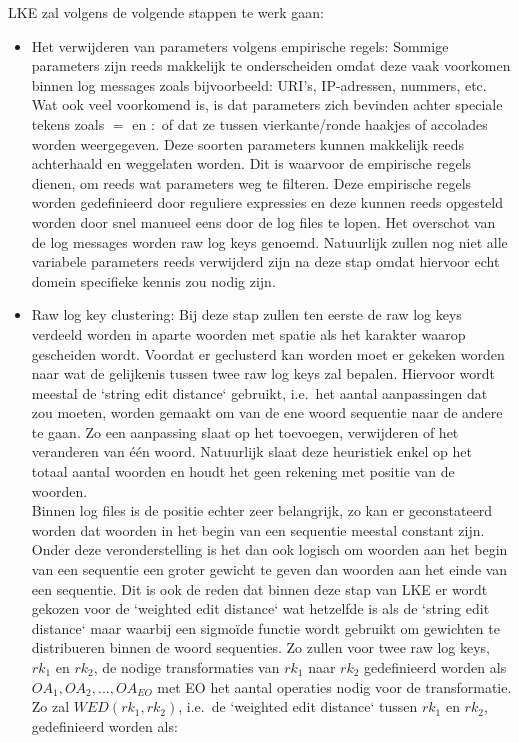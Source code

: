 LKE zal volgens de volgende stappen te werk gaan:
\begin{itemize}
    \item Het verwijderen van parameters volgens empirische regels: Sommige parameters zijn reeds makkelijk te onderscheiden omdat deze vaak voorkomen binnen log messages zoals bijvoorbeeld: URI's, IP-adressen, nummers, etc. Wat ook veel voorkomend is, is dat parameters zich bevinden achter speciale tekens zoals $=$ en $:$ of dat ze tussen vierkante/ronde haakjes of accolades worden weergegeven. Deze soorten parameters kunnen makkelijk reeds achterhaald en weggelaten worden. Dit is waarvoor de empirische regels dienen, om reeds wat parameters weg te filteren. Deze empirische regels worden gedefinieerd door reguliere expressies en deze kunnen reeds opgesteld worden door snel manueel eens door de log files te lopen. Het overschot van de log messages worden raw log keys genoemd. Natuurlijk zullen nog niet alle variabele parameters reeds verwijderd zijn na deze stap omdat hiervoor echt domein specifieke kennis zou nodig zijn.\\
    
    \item Raw log key clustering: Bij deze stap zullen ten eerste de raw log keys verdeeld worden in aparte woorden met spatie als het karakter waarop gescheiden wordt. Voordat er geclusterd kan worden moet er gekeken worden naar wat de gelijkenis tussen twee raw log keys zal bepalen. Hiervoor wordt meestal de `string edit distance` gebruikt, i.e.\ het aantal aanpassingen dat zou moeten, worden gemaakt om van de ene woord sequentie naar de andere te gaan. Zo een aanpassing slaat op het toevoegen, verwijderen of het veranderen van één woord. Natuurlijk slaat deze heuristiek enkel op het totaal aantal woorden en houdt het geen rekening met positie van de woorden.\\
    
    Binnen log files is de positie echter zeer belangrijk, zo kan er geconstateerd worden dat woorden in het begin van een sequentie meestal constant zijn. Onder deze veronderstelling is het dan ook logisch om woorden aan het begin van een sequentie een groter gewicht te geven dan woorden aan het einde van een sequentie. Dit is ook de reden dat binnen deze stap van LKE er wordt gekozen voor de `weighted edit distance` wat hetzelfde is als de `string edit distance` maar waarbij een sigmoïde functie wordt gebruikt om gewichten te distribueren binnen de woord sequenties. Zo zullen voor twee raw log keys, \(rk_{1}\) en \(rk_{2}\), de nodige transformaties van \(rk_{1}\) naar \(rk_{2}\) gedefinieerd worden als \(OA_{1}, OA_{2}, ..., OA_{EO}\) met EO het aantal operaties nodig voor de transformatie. Zo zal \(WED(rk_{1}, rk_{2})\), i.e.\ de `weighted edit distance` tussen \(rk_{1}\) en \(rk_{2}\), gedefinieerd worden als:
    

\end{itemize}
